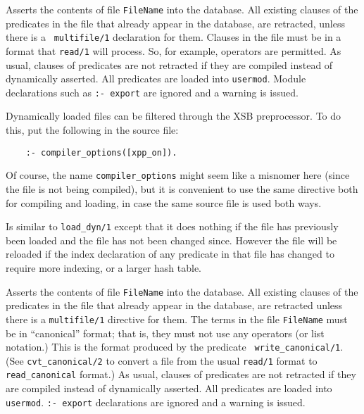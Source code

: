 \begin{description}
\label{load_dyn/1}
    Asserts the contents of file {\tt FileName} into the database.
    All existing clauses of the predicates in the file that already
    appear in the database, are retracted, unless there is a {\tt
    multifile/1} declaration for them.  Clauses in the file must be
    in a format that {\tt read/1} will process.  So, for example,
    operators are permitted.  As usual, clauses of predicates are not
    retracted if they are compiled instead of dynamically asserted.
    All predicates are loaded into {\tt usermod}.  Module declarations
    such as {\tt :- export} are ignored and a warning is issued.

    Dynamically loaded files can be filtered through the XSB preprocessor.
    To do this, put the following in the source file: 
    \begin{verbatim}
    :- compiler_options([xpp_on]).      
    \end{verbatim}

    Of course, the name \verb|compiler_options| might seem like a misnomer
    here (since the file is not being compiled), but it is convenient to
    use the same directive both for compiling and loading, in case the same
    source file is used both ways.

    Is similar to {\tt load\_dyn/1} except that it does nothing if the
    file has previously been loaded and the file has not been changed
    since.  However the file will be reloaded if the index declaration of
    any predicate in that file has changed to require more indexing, or a
    larger hash table.

    Asserts the contents of file {\tt FileName} into the database.
    All existing clauses of the predicates in the file that already appear
    in the database, are retracted unless there is a {\tt multifile/1}
    directive for them.  The terms in the file {\tt FileName} must be in
    ``canonical'' format; that is, they must not use any operators (or
    list notation.) This is the format produced by the predicate {\tt
    write\_canonical/1}. (See {\tt cvt\_canonical/2} to convert a file from
    the usual {\tt read/1} format to {\tt read\_canonical} format.)  As
    usual, clauses of predicates are not retracted if they are compiled
    instead of dynamically asserted. All predicates are loaded into {\tt
    usermod}.  {\tt :- export} declarations are ignored and a warning is
    issued.


\end{description}
